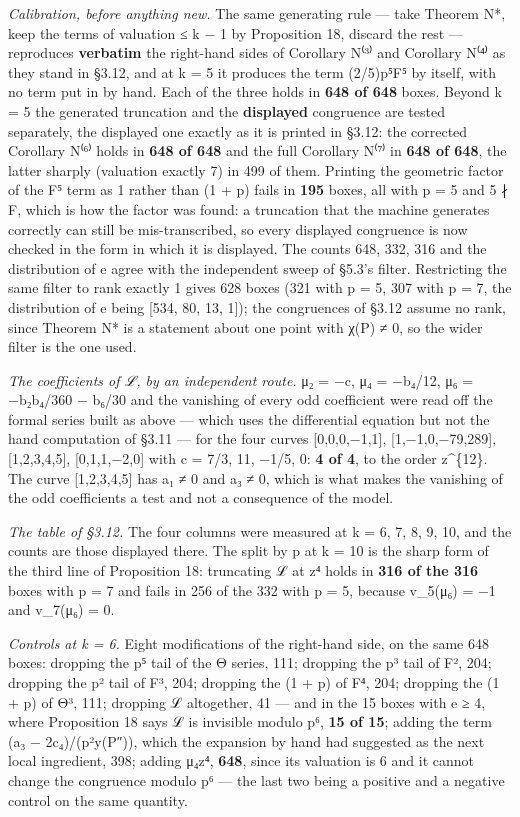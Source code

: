 \documentclass[11pt,a4paper]{article}
\theoremstyle{named}
\begin{document}
\textit{Calibration, before anything new.} The same generating rule — take Theorem N*, keep the terms of valuation ≤ k − 1 by Proposition 18, discard the rest — reproduces \textbf{verbatim} the right-hand sides of Corollary N⁽³⁾ and Corollary N⁽⁴⁾ as they stand in §3.12, and at k = 5 it produces the term (2/5)p⁵F⁵ by itself, with no term put in by hand. Each of the three holds in \textbf{648 of 648} boxes. Beyond k = 5 the generated truncation and the \textbf{displayed} congruence are tested separately, the displayed one exactly as it is printed in §3.12: the corrected Corollary N⁽⁶⁾ holds in \textbf{648 of 648} and the full Corollary N⁽⁷⁾ in \textbf{648 of 648}, the latter sharply (valuation exactly 7) in 499 of them. Printing the geometric factor of the F⁵ term as 1 rather than (1 + p) fails in \textbf{195} boxes, all with p = 5 and 5 ∤ F, which is how the factor was found: a truncation that the machine generates correctly can still be mis-transcribed, so every displayed congruence is now checked in the form in which it is displayed. The counts 648, 332, 316 and the distribution of e agree with the independent sweep of §5.3's filter. Restricting the same filter to rank exactly 1 gives 628 boxes (321 with p = 5, 307 with p = 7, the distribution of e being [534, 80, 13, 1]); the congruences of §3.12 assume no rank, since Theorem N* is a statement about one point with χ(P) ≠ 0, so the wider filter is the one used.

\textit{The coefficients of ℒ, by an independent route.} μ₂ = −c, μ₄ = −b₄/12, μ₆ = −b₂b₄/360 − b₆/30 and the vanishing of every odd coefficient were read off the formal series built as above — which uses the differential equation but not the hand computation of §3.11 — for the four curves [0,0,0,−1,1], [1,−1,0,−79,289], [1,2,3,4,5], [0,1,1,−2,0] with c = 7/3, 11, −1/5, 0: \textbf{4 of 4}, to the order z\textasciicircum{}\{12\}. The curve [1,2,3,4,5] has a₁ ≠ 0 and a₃ ≠ 0, which is what makes the vanishing of the odd coefficients a test and not a consequence of the model.

\textit{The table of §3.12.} The four columns were measured at k = 6, 7, 8, 9, 10, and the counts are those displayed there. The split by p at k = 10 is the sharp form of the third line of Proposition 18: truncating ℒ at z⁴ holds in \textbf{316 of the 316} boxes with p = 7 and fails in 256 of the 332 with p = 5, because v\_5(μ₆) = −1 and v\_7(μ₆) = 0.

\textit{Controls at k = 6.} Eight modifications of the right-hand side, on the same 648 boxes: dropping the p⁵ tail of the Θ series, 111; dropping the p³ tail of F², 204; dropping the p² tail of F³, 204; dropping the (1 + p) of F⁴, 204; dropping the (1 + p) of Θ³, 111; dropping ℒ altogether, 41 — and in the 15 boxes with e ≥ 4, where Proposition 18 says ℒ is invisible modulo p⁶, \textbf{15 of 15}; adding the term (a₃ − 2c₄)/(p²y(P″)), which the expansion by hand had suggested as the next local ingredient, 398; adding μ₄z⁴, \textbf{648}, since its valuation is 6 and it cannot change the congruence modulo p⁶ — the last two being a positive and a negative control on the same quantity.
\end{document}
